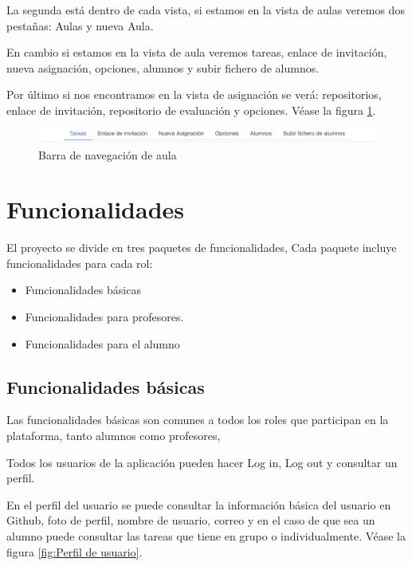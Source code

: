 La segunda está dentro de cada vista, si estamos en la vista de aulas veremos dos pestañas: Aulas y nueva Aula.

En cambio si estamos en la vista de aula veremos tareas, enlace de invitación, nueva asignación, opciones, alumnos y subir fichero de alumnos.

Por último si nos encontramos en la vista de asignación se verá: repositorios, enlace de invitación, repositorio de evaluación y opciones.
Véase la figura \ref{fig:Barra de navegacion de aula}.

\begin{figure}[!th]
\begin{center}
\includegraphics[scale=0.5]{images/navaula}
\caption{Barra de navegación de aula}
\label{fig:Barra de navegacion de aula}
\end{center}
\end{figure}


\section{Funcionalidades}
\label{:sec6}

El proyecto se divide en tres paquetes de funcionalidades, Cada paquete incluye funcionalidades para cada rol:

\begin{itemize}
  \item Funcionalidades básicas
  \item Funcionalidades para profesores.
  \item Funcionalidades para el alumno
\end{itemize}

\subsection{Funcionalidades básicas}
\label{3:6:1}

Las funcionalidades básicas son comunes a todos los roles que participan en la plataforma, tanto alumnos como profesores, 

Todos los usuarios de la aplicación pueden hacer Log in, Log out y consultar un perfil.

En el perfil del usuario se puede consultar la información básica del usuario en Github, foto de perfil, nombre de usuario, correo y en el caso de que sea un alumno puede consultar las tareas que tiene en grupo o individualmente.
Véase la figura \ref{fig:Perfil de usuario}.

